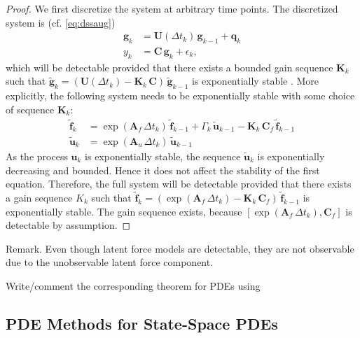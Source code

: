 \documentclass[journal]{IEEEtran}
\newcommand{\simo}[1]{{\color{red}#1}}
\begin{document}
\begin{proof}
We first discretize the system at arbitrary time points. The discretized system is (cf. \eqref{eq:dssaug})
%
\begin{equation}
\begin{split}
   \mathbf{g}_k &= \mathbf{U}(\Delta t_k) \, \mathbf{g}_{k-1} +  \mathbf{q}_k \\
  y_k &=  \mathbf{C} \,  \mathbf{g}_k + \epsilon_k,
\end{split}
\end{equation}
%
which will be detectable provided that there exists a bounded gain sequence $\mathbf{K}_k$ such that $\tilde{\mathbf{g}}_k = (\mathbf{U}(\Delta t_k) - \mathbf{K}_k \, \mathbf{C}) \, \tilde{\mathbf{g}}_{k-1}$ is exponentially stable \cite{Anderson:1981}. More explicitly, the following system needs to be exponentially stable with some choice of sequence $\mathbf{K}_k$:
%
\begin{equation}
\begin{split}
  \tilde{\mathbf{f}}_k &= \exp(\mathbf{A}_f \, \Delta t_k) \, \tilde{\mathbf{f}}_{k-1}
  + \Gamma_k \, \tilde{\mathbf{u}}_{k-1} - \mathbf{K}_k \, \mathbf{C}_f \, \tilde{\mathbf{f}}_{k-1} \\
  \tilde{\mathbf{u}}_k &= \exp(\mathbf{A}_u \, \Delta t_k) \, \tilde{\mathbf{u}}_{k-1} 
\end{split}
\end{equation}
%
As the process $\mathbf{u}_k$ is exponentially stable, the sequence $\tilde{\mathbf{u}}_k$ is exponentially decreasing and bounded. Hence it does not affect the stability of the first equation. Therefore, the full system will be detectable provided that there exists a gain sequence $K_k$ such that $\tilde{\mathbf{f}}_k = (\exp(\mathbf{A}_f \, \Delta t_k) - \mathbf{K}_k \, \mathbf{C}_f) \, \tilde{\mathbf{f}}_{k-1}$ is exponentially stable. The gain sequence exists, because $[\exp(\mathbf{A}_f \, \Delta t_k),\mathbf{C}_f]$ is detectable by assumption. 
\end{proof}

\simo{Remark. Even though latent force models are detectable, they are not observable due to the unobservable latent force component.}

\simo{Write/comment the corresponding theorem for PDEs using \cite{Curtain:2012}}

\subsection{PDE Methods for State-Space PDEs}
\end{document}
